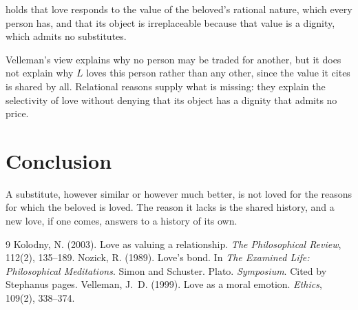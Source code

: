 \documentclass{situationist-preprint}
\begin{document}
\begin{objection}[Velleman]
\citet{Velleman1999} holds that love responds to the value of the beloved's rational nature, which every person has, and that its object is irreplaceable because that value is a dignity, which admits no substitutes.
\end{objection}

\begin{reply}
Velleman's view explains why no person may be traded for another, but it does not explain why $L$ loves this person rather than any other, since the value it cites is shared by all. Relational reasons supply what is missing: they explain the selectivity of love without denying that its object has a dignity that admits no price.
\end{reply}

\section{Conclusion}

A substitute, however similar or however much better, is not loved for the reasons for which the beloved is loved. The reason it lacks is the shared history, and a new love, if one comes, answers to a history of its own.

\begin{thebibliography}{9}\small
{} Kolodny, N. (2003). Love as valuing a relationship. \emph{The Philosophical Review}, 112(2), 135--189.
 Nozick, R. (1989). Love's bond. In \emph{The Examined Life: Philosophical Meditations}. Simon and Schuster.
 Plato. \emph{Symposium}. Cited by Stephanus pages.
 Velleman, J.~D. (1999). Love as a moral emotion. \emph{Ethics}, 109(2), 338--374.
\end{thebibliography}
\end{document}
